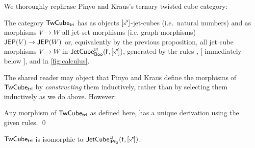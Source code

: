 \documentclass[a4paper]{memoir}
\begin{document}
We thoroughly rephrase Pinyo and Kraus's ternary twisted cube category:
\begin{definition} \cite[def.\ 34]{pinyo-twisted} \label{def:twisted-tri}
	The category ${\mathsf{TwCube}}_{\mathsf{tri}}$ has as objects $[\ypolar]$-jet-cubes (i.e.\ natural numbers) and as morphisms $V \to W$ all jet set morphisms (i.e. graph morphisms) $\mathsf{JEP}(V) \to \mathsf{JEP}(W)$ or, equivalently by the previous proposition, all jet cube morphisms $V \to W$ in $\jetcubefwd \cartes \booleanalg {[\ypolar]}$,	
	 generated by the rules , [ immediately below ],  and  in \cref{fig:calculus}.
\end{definition}
The shared reader may object that Pinyo and Kraus define the morphisms of ${\mathsf{TwCube}}_{\mathsf{tri}}$ by \emph{constructing} them inductively, rather than by selecting them inductively as we do above. However:
\begin{corollary} \label{thm:twisted-tri-inductive}
	Any morphism of ${\mathsf{TwCube}}_{\mathsf{tri}}$ as defined here, has a unique derivation using the given rules. \qed
\end{corollary}
\begin{proposition}
	${\mathsf{TwCube}}_{\mathsf{tri}}$ is isomorphic to $\jetcubefwd \affine \bipointedsym {[\ypolar]}$.
\end{proposition}
\end{document}
